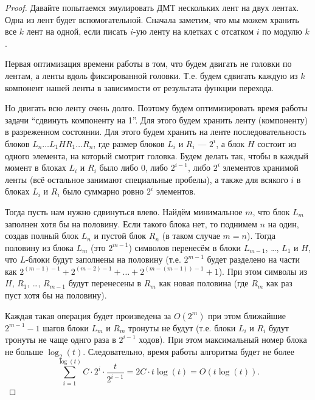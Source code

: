 \documentclass[12pt,a4paper]{article}
\begin{document}

    \begin{proof}
        Давайте попытаемся эмулировать ДМТ нескольких лент на двух лентах. Одна из лент будет вспомогательной. Сначала заметим, что мы можем хранить все $k$ лент на одной, если писать $i$-ую ленту на клетках с отсатком $i$ по модулю $k$.
        
        Первая оптимизация времени работы в том, что будем двигать не головки по лентам, а ленты вдоль фиксированной головки. Т.е. будем сдвигать каждую из $k$ компонент нашей ленты в зависимости от результата функции перехода.
        
        Но двигать всю ленту очень долго. Поэтому будем оптимизировать время работы задачи ``сдвинуть компоненту на 1''. Для этого будем хранить ленту (компоненту) в разреженном состоянии. Для этого будем хранить на ленте последовательность блоков $L_n \dots L_1 H R_1 \dots R_n$, где размер блоков $L_i$ и $R_i$ --- $2^i$, а блок $H$ состоит из одного элемента, на который смотрит головка. Будем делать так, чтобы в каждый момент в блоках $L_i$ и $R_i$ было либо $0$, либо $2^{i-1}$, либо $2^i$ элементов хранимой ленты (всё остальное занимают специальные пробелы), а также для всякого $i$ в блоках $L_i$ и $R_i$ было суммарно ровно $2^i$ элементов.

        Тогда пусть нам нужно сдвинуться влево. Найдём минимальное $m$, что блок $L_m$ заполнен хотя бы на половину. Если такого блока нет, то поднимем $n$ на один, создав полный блок $L_n$ и пустой блок $R_n$ (в таком случае $m = n$). Тогда половину из блока $L_m$ (это $2^{m-1}$) символов перенесём в блоки $L_{m-1}$, \dots, $L_1$ и $H$, что $L$-блоки будут заполнены на половину (т.е. $2^{m-1}$ будет разделено на части как $2^{(m-1)-1} + 2^{(m-2)-1} + \dots + 2^{(m-(m-1))-1} + 1$). При этом символы из $H$, $R_1$, \dots, $R_{m-1}$ будут перенесены в $R_m$ как новая половина (где $R_m$ как раз пуст хотя бы на половину).

        Каждая такая операция будет произведена за $O(2^m)$ при этом ближайшие $2^{m-1}-1$ шагов блоки $L_m$ и $R_m$ тронуты не будут (т.е. блоки $L_i$ и $R_i$ будут тронуты не чаще однго раза в $2^{i-1}$ ходов). При этом максимальный номер блока не больше $\log_2(t)$. Следовательно, время работы алгоритма будет не более 
        \[\sum_{i=1}^{\log(t)} C \cdot 2^i \cdot \frac{t}{2^{i-1}} = 2C \cdot t \log (t) = O(t \log(t)).\]
    \end{proof}
\end{document}
